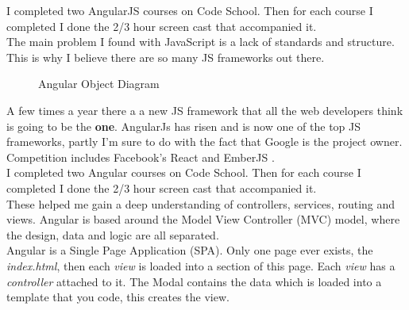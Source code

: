 I completed two AngularJS \cite{angular} courses on Code School. 
Then for each course I completed I done the 2/3 hour screen cast that accompanied it.
\\
The main problem I found with JavaScript is a lack of standards and structure. 
This is why I believe there are so many JS frameworks out there.
\begin{figure}[H] 
	\caption{Angular Object Diagram}
	\label{fig:speciation}
\end{figure}
A few times a year there a a new JS framework that all the web developers think is going to be the \textbf{one}.
AngularJs has risen and is now one of the top JS frameworks, partly I'm sure to do with the fact that Google is the project owner.
Competition includes Facebook's React \cite{react} and EmberJS \cite{ember}.
\\

I completed two Angular courses on Code School. 
Then for each course I completed I done the 2/3 hour screen cast that accompanied it.
\\

These helped me gain a deep understanding of controllers, services, routing and views.
Angular is based around the Model View Controller (MVC) model, where the design, data and logic are all separated.
\\
Angular is a Single Page Application (SPA). Only one page ever exists, the \textit{index.html}, then each \textit{view} is loaded into a section of this page.
Each \textit{view} has a \textit{controller} attached to it. 
The Modal contains the data which is loaded into a template that you code, this creates the view.

